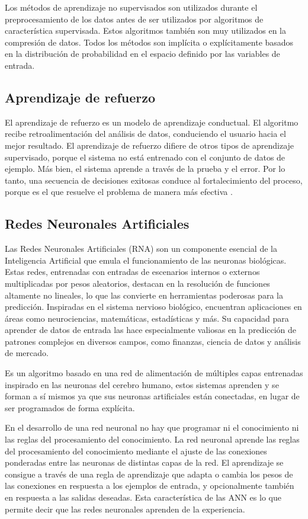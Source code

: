 Los métodos de aprendizaje no supervisados son utilizados durante el preprocesamiento de los datos antes de ser utilizados por algoritmos de característica supervisada. Estos algoritmos también son muy utilizados en la compresión de datos. Todos los métodos son implícita o explícitamente basados en la distribución de probabilidad en el espacio definido por las variables de entrada\cite{de2014aprendizaje}.

\subsection{Aprendizaje de refuerzo}

El aprendizaje de refuerzo es un modelo de aprendizaje conductual. El algoritmo recibe retroalimentación del análisis de datos, conduciendo el usuario hacia el mejor resultado. El aprendizaje de refuerzo difiere de otros tipos de aprendizaje supervisado, porque el sistema no está entrenado con el conjunto de datos de ejemplo. Más bien, el sistema aprende a través de la prueba y el error. Por lo tanto, una secuencia de decisiones exitosas conduce al fortalecimiento del proceso, porque es el que resuelve el problema de manera más efectiva \cite{ibm}.

\subsection{Redes Neuronales Artificiales}
Las Redes Neuronales Artificiales (RNA) son un componente esencial de la Inteligencia Artificial que emula el funcionamiento de las neuronas biológicas. Estas redes, entrenadas con entradas de escenarios internos o externos multiplicadas por pesos aleatorios, destacan en la resolución de funciones altamente no lineales, lo que las convierte en herramientas poderosas para la predicción. Inspiradas en el sistema nervioso biológico, encuentran aplicaciones en áreas como neurociencias, matemáticas, estadísticas y más. Su capacidad para aprender de datos de entrada las hace especialmente valiosas en la predicción de patrones complejos en diversos campos, como finanzas, ciencia de datos y análisis de mercado.

Es un algoritmo basado en una red de alimentación de múltiples capas entrenadas inspirado en las neuronas del cerebro humano, estos sistemas aprenden y se forman a sí mismos ya que sus neuronas artificiales están conectadas, en lugar de ser programados de forma explícita\cite{herrera2020prediccion }.

\vspace{1\baselineskip}
En el desarrollo de una red neuronal no hay que programar ni el conocimiento ni las reglas del procesamiento del conocimiento. La red neuronal aprende las reglas del procesamiento del conocimiento mediante el ajuste de las conexiones ponderadas entre las neuronas de distintas capas de la red.
El aprendizaje se consigue a través de una regla de aprendizaje que adapta o cambia los pesos de las conexiones en respuesta a los ejemplos de entrada, y opcionalmente también en respuesta a las salidas deseadas. Esta característica de las ANN es lo que permite decir que las redes neuronales aprenden de la experiencia\cite{olabe1998redes}. 

